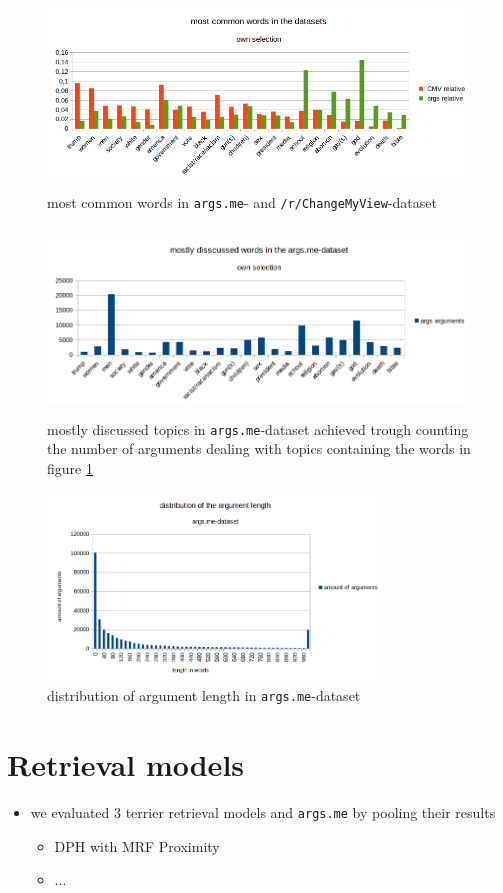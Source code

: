 \documentclass{scrartcl}
\begin{document}
	\begin{figure}[hpbt]
	\centering
	\includegraphics[height=5cm]{img/args_vs_cmv-words.png}
	\caption{most common words in \texttt{args.me}- and \texttt{/r/ChangeMyView}-dataset}
	\label{fig:common_words}
	\end{figure}

	\begin{figure}[hpbt]
	\centering
	\includegraphics[height=5cm]{img/args_amt_of_arguments.png}
	\caption{mostly discussed topics in \texttt{args.me}-dataset achieved trough counting the number of arguments dealing with topics containing the words in figure \ref{fig:common_words}}
	\label{fig:common_words_arguments}
	\end{figure}
		\begin{figure}[hpbt]
		\centering
		\includegraphics[height=5cm]{img/args_distr_of_length.png}
		\caption{distribution of argument length in \texttt{args.me}-dataset}
		\label{fig:distr_length}
	\end{figure}

	\section{Retrieval models}
	\begin{itemize}
		\item we evaluated 3 terrier retrieval models and \texttt{args.me} by pooling their results
		\begin{itemize}
			\item DPH with MRF Proximity
			\item ...
		\end{itemize}
	\end{itemize}
\end{document}

